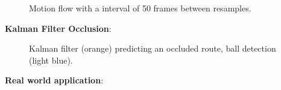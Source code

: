 \documentclass{sciposter}
\begin{document}
\begin{multicols}{3}
\begin{figure}[!h]
	\centering
			\setlength{\fboxsep}{1pt}
			\setlength{\fboxrule}{1pt}
	\caption{Motion flow with a interval of 50 frames between resamples.}
	\label{fig:motion_50}
\end{figure}

\textbf{Kalman Filter Occlusion}:

\begin{figure}[!h]
	\centering
			\setlength{\fboxsep}{1pt}
			\setlength{\fboxrule}{1pt}
	\caption{Kalman filter (orange) predicting an occluded route, ball detection (light blue).}
	\label{fig:occlusion}
\end{figure}

\textbf{Real world application}:


\end{multicols}
\end{document}

